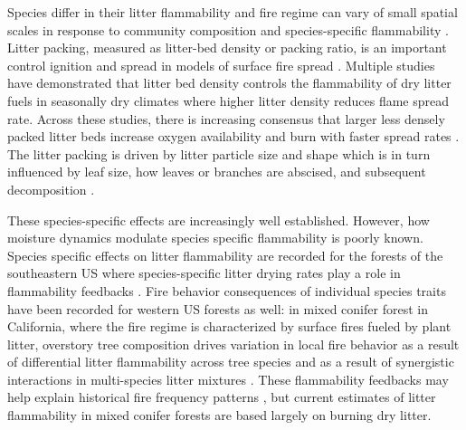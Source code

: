 \documentclass[letterpaper,12pt]{article}
\begin{document}
Species differ in their litter flammability \cite{Fonda+Belanger+etal-1998,
  Fonda-2001, Scarff+Westoby-2006, Kane+Varner+etal-2008,
  Cornwell+Elvira+etal-2015} and fire regime can vary of small spatial scales in response to community composition and species-specific flammability \citep{Stephens-2001, Hille+Stephens-2005, Schwilk+Caprio-2011}. Litter packing, measured as litter-bed density or
packing ratio, is an important control ignition and spread in models of surface
fire spread \citep{Weber-1991, Balbi+Santoni+etal-1999, Morvan+Larini-2001}.
Multiple studies have demonstrated that litter bed density controls the
flammability of dry litter fuels in seasonally dry climates where higher litter
density reduces flame spread rate. Across these studies, there is increasing
consensus that larger less densely packed litter beds increase oxygen
availability and burn with faster spread rates \citep{Scarff+Westoby-2006,
  Schwilk+Caprio-2011, Magalhaes+Schwilk-2012, Cornwell+Elvira+etal-2015,
  Varner+Kane+etal-2015, Kreye+Varner+etal-2018}. The litter packing is driven
by litter particle size and shape which is in turn influenced by leaf size, how
leaves or branches are abscised, and subsequent decomposition
\citep{Fonda+Belanger+etal-1998, Stephens+Finney+etal-2004,
  Scarff+Westoby-2006, Kane+Varner+etal-2008, Cornwell+Elvira+etal-2015,
  Zhao+Cornwell+etal-2016, Grootemaat+Wright+etal-2017,
  Prior+Murphy+etal-2018, Zhao+vanLogtestijn+etal-2019}.

These species-specific effects are increasingly well established. However, how
moisture dynamics modulate species specific flammability is poorly known. Species
specific effects on litter flammability are recorded for the forests of the
southeastern US \citep{Nowacki+Abrams-2008} where species-specific litter
drying rates play a role in flammability feedbacks
\citep{Kreye+Varner+etal-2013}. Fire behavior consequences of individual
species traits have been recorded for western US forests as well: in mixed
conifer forest in California, where the fire regime is characterized by surface
fires fueled by plant litter, overstory tree composition drives variation in
local fire behavior \citep{Schwilk+Caprio-2011} as a result of differential
litter flammability across tree species and as a result of synergistic
interactions in multi-species litter mixtures \citep{Magalhaes+Schwilk-2012}.
These flammability feedbacks may help explain historical fire frequency
patterns \citep{Schwilk+Caprio-2011}, but current estimates of litter
flammability in mixed conifer forests are based largely on burning dry litter.
\end{document}
